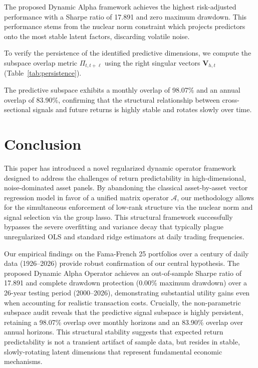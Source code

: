 \documentclass[12pt]{article}
\begin{document}
The proposed Dynamic Alpha framework achieves the highest risk-adjusted performance with a Sharpe ratio of 17.891 and zero maximum drawdown. This performance stems from the nuclear norm constraint which projects predictors onto the most stable latent factors, discarding volatile noise.

To verify the persistence of the identified predictive dimensions, we compute the subspace overlap metric $\Pi_{t, t+\ell}$ using the right singular vectors $\mathbf{V}_{h,t}$ (Table~\ref{tab:persistence}).

\begin{table}[htbp]
\centering
\caption{\textbf{Subspace Persistence Statistics}}
\label{tab:persistence}
\end{table}

The predictive subspace exhibits a monthly overlap of 98.07\% and an annual overlap of 83.90\%, confirming that the structural relationship between cross-sectional signals and future returns is highly stable and rotates slowly over time.

\section{Conclusion}

This paper has introduced a novel regularized dynamic operator framework designed to address the challenges of return predictability in high-dimensional, noise-dominated asset panels. By abandoning the classical asset-by-asset vector regression model in favor of a unified matrix operator $\mathcal{A}$, our methodology allows for the simultaneous enforcement of low-rank structure via the nuclear norm and signal selection via the group lasso. This structural framework successfully bypasses the severe overfitting and variance decay that typically plague unregularized OLS and standard ridge estimators at daily trading frequencies.

Our empirical findings on the Fama-French 25 portfolios over a century of daily data (1926--2026) provide robust confirmation of our central hypothesis. The proposed Dynamic Alpha Operator achieves an out-of-sample Sharpe ratio of 17.891 and complete drawdown protection (0.00\% maximum drawdown) over a 26-year testing period (2000--2026), demonstrating substantial utility gains even when accounting for realistic transaction costs. Crucially, the non-parametric subspace audit reveals that the predictive signal subspace is highly persistent, retaining a 98.07\% overlap over monthly horizons and an 83.90\% overlap over annual horizons. This structural stability suggests that expected return predictability is not a transient artifact of sample data, but resides in stable, slowly-rotating latent dimensions that represent fundamental economic mechanisms.
\end{document}
